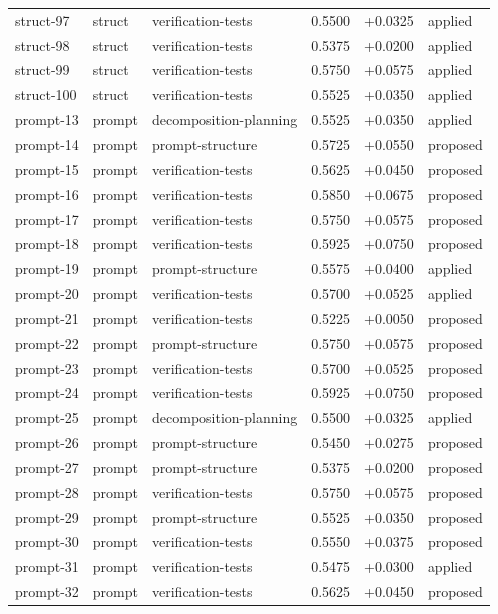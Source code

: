\begin{center}
\begin{longtable}{llp{5.2cm}rrl}
struct-97 & struct & verification-tests & 0.5500 & +0.0325 & applied \\
struct-98 & struct & verification-tests & 0.5375 & +0.0200 & applied \\
struct-99 & struct & verification-tests & 0.5750 & +0.0575 & applied \\
struct-100 & struct & verification-tests & 0.5525 & +0.0350 & applied \\
prompt-13 & prompt & decomposition-planning & 0.5525 & +0.0350 & applied \\
prompt-14 & prompt & prompt-structure & 0.5725 & +0.0550 & proposed \\
prompt-15 & prompt & verification-tests & 0.5625 & +0.0450 & proposed \\
prompt-16 & prompt & verification-tests & 0.5850 & +0.0675 & proposed \\
prompt-17 & prompt & verification-tests & 0.5750 & +0.0575 & proposed \\
prompt-18 & prompt & verification-tests & 0.5925 & +0.0750 & proposed \\
prompt-19 & prompt & prompt-structure & 0.5575 & +0.0400 & applied \\
prompt-20 & prompt & verification-tests & 0.5700 & +0.0525 & applied \\
prompt-21 & prompt & verification-tests & 0.5225 & +0.0050 & proposed \\
prompt-22 & prompt & prompt-structure & 0.5750 & +0.0575 & proposed \\
prompt-23 & prompt & verification-tests & 0.5700 & +0.0525 & proposed \\
prompt-24 & prompt & verification-tests & 0.5925 & +0.0750 & proposed \\
prompt-25 & prompt & decomposition-planning & 0.5500 & +0.0325 & applied \\
prompt-26 & prompt & prompt-structure & 0.5450 & +0.0275 & proposed \\
prompt-27 & prompt & prompt-structure & 0.5375 & +0.0200 & proposed \\
prompt-28 & prompt & verification-tests & 0.5750 & +0.0575 & proposed \\
prompt-29 & prompt & prompt-structure & 0.5525 & +0.0350 & proposed \\
prompt-30 & prompt & verification-tests & 0.5550 & +0.0375 & proposed \\
prompt-31 & prompt & verification-tests & 0.5475 & +0.0300 & applied \\
prompt-32 & prompt & verification-tests & 0.5625 & +0.0450 & proposed \\

\end{longtable}
\end{center}

